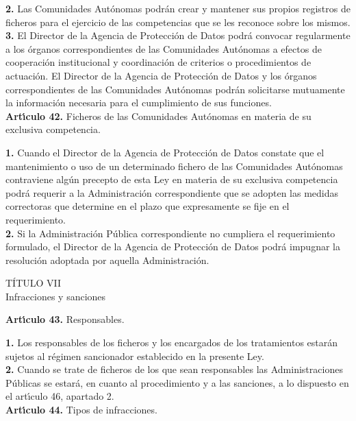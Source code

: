 {\bf 2.} Las Comunidades Aut\'onomas podr\'an crear y mantener sus propios 
registros de ficheros para el ejercicio de las competencias que se les reconoce 
sobre los mismos.\\

{\bf 3.} El Director de la Agencia de Protecci\'on de Datos podr\'a convocar 
regularmente a los \'organos correspondientes de las Comunidades Aut\'onomas a 
efectos de cooperaci\'on institucional y coordinaci\'on de criterios o 
procedimientos de actuaci\'on. El Director de la Agencia de Protecci\'on de 
Datos y los \'organos correspondientes de las Comunidades Aut\'onomas podr\'an 
solicitarse mutuamente la informaci\'on necesaria para el cumplimiento de sus 
funciones.
\vspace{0.3cm}\\
{\large {\bf Art\'{\i}culo 42.} Ficheros de las Comunidades Aut\'onomas en 
materia de su exclusiva competencia.}

{\bf 1.} Cuando el Director de la Agencia de Protecci\'on de Datos constate que 
el mantenimiento o uso de un determinado fichero de las Comunidades Aut\'onomas 
contraviene alg\'un precepto de esta Ley en materia de su exclusiva competencia 
podr\'a requerir a la Administraci\'on correspondiente que se adopten las 
medidas correctoras que determine en el plazo que expresamente se fije en el 
requerimiento.\\

{\bf 2.} Si la Administraci\'on P\'ublica correspondiente no cumpliera el 
requerimiento formulado, el Director de la Agencia de Protecci\'on de Datos 
podr\'a impugnar la resoluci\'on adoptada por aquella Administraci\'on.
\begin{center}
{\LARGE T\'ITULO VII}\\ {\large Infracciones y sanciones} \end{center}
\vspace{0.3cm} {\large {\bf Art\'{\i}culo 43.} Responsables.}

{\bf 1.} Los responsables de los ficheros y los encargados de los
tratamientos estar\'an sujetos al r\'egimen sancionador establecido en
la presente Ley.\\

{\bf 2.} Cuando se trate de ficheros de los que sean responsables las
Administraciones P\'ublicas se estar\'a, en cuanto al procedimiento
y a las sanciones, a lo dispuesto en el art\'{\i}culo 46, apartado 2.
\vspace{0.3cm}\\ {\large {\bf Art\'{\i}culo 44.} Tipos de infracciones.}

